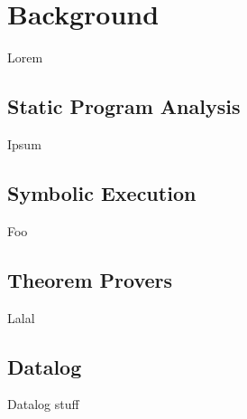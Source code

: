 
\chapter{Background}\label{c:background}
Lorem\cite{chaurasia2017data}

\section{Static Program Analysis}
Ipsum

\section{Symbolic Execution}
Foo

\section{Theorem Provers}
Lalal

\section{Datalog}
Datalog stuff